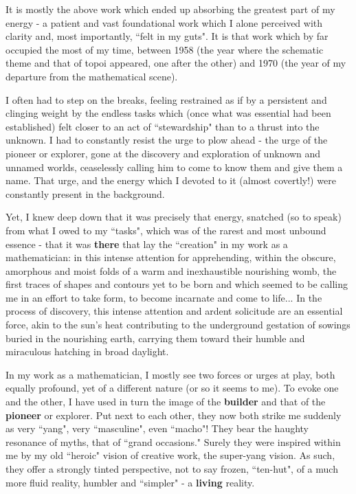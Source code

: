 It is mostly the above work which ended up absorbing the greatest part of my energy - a patient and vast foundational work which I alone perceived with clarity and, most importantly, ``felt in my guts". It is that work which by far occupied the most of my time, between 1958 (the year where the schematic theme and that of topoi appeared, one after the other) and 1970 (the year of my departure from the mathematical scene).

I often had to step on the breaks, feeling restrained as if by a persistent and clinging weight by the endless tasks which (once what was essential had been established) felt closer to an act of ``stewardship" than to a thrust into the unknown. I had to constantly resist the urge to plow ahead - the urge of the pioneer or explorer, gone at the discovery and exploration of unknown and unnamed worlds, ceaselessly calling him to come to know them and give them a name. That urge, and the energy which I devoted to it (almost covertly!) were constantly present in the background.

Yet, I knew deep down that it was precisely that energy, snatched (so to speak) from what I owed to my ``tasks", which was of the rarest and most unbound essence - that it was \textbf{there} that lay the ``creation" in my work as a mathematician: in this intense attention for apprehending, within the obscure, amorphous and moist folds of a warm and inexhaustible nourishing womb, the first traces of shapes and contours yet to be born and which seemed to be calling me in an effort to take form, to become incarnate and come to life... In the process of discovery, this intense attention and ardent solicitude are an essential force, akin to the sun's heat contributing to the underground gestation of sowings buried in the nourishing earth, carrying them toward their humble and miraculous hatching in broad daylight.

In my work as a mathematician, I mostly see two forces or urges at play, both equally profound, yet of a different nature (or so it seems to me). To evoke one and the other, I have used in turn the image of the \textbf{builder} and that of the \textbf{pioneer} or explorer. Put next to each other, they now both strike me suddenly as very ``yang", very ``masculine", even ``macho"! They bear the haughty resonance of myths, that of ``grand occasions." Surely they were inspired within me by my old ``heroic" vision of creative work, the super-yang vision. As such, they offer a strongly tinted perspective, not to say frozen, ``ten-hut", of a much more fluid reality, humbler and ``simpler" - a \textbf{living} reality.

